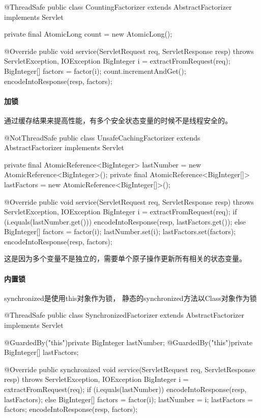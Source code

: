 \begin{Java}[使用AtomicLong来实现原子操作]
@ThreadSafe
public class CountingFactorizer extends AbstractFactorizer implements Servlet {

	private final AtomicLong count = new AtomicLong();
	
	@Override
	public void service(ServletRequest req, ServletResponse resp)
			throws ServletException, IOException {
		BigInteger i = extractFromRequest(req);
		BigInteger[] factors = factor(i);
		count.incrementAndGet();
		encodeIntoResponse(resp, factors);
	}

}
\end{Java}

\paragraph{加锁}通过缓存结果来提高性能，有多个安全状态变量的时候不是线程安全的。
\begin{Java}
@NotThreadSafe
public class UnsafeCachingFactorizer extends AbstractFactorizer implements
		Servlet {
	
	private final AtomicReference<BigInteger> lastNumber 
		= new AtomicReference<BigInteger>();
	private final AtomicReference<BigInteger[]> lastFactors
		= new AtomicReference<BigInteger[]>();

	@Override
	public void service(ServletRequest req, ServletResponse resp)
			throws ServletException, IOException {
		BigInteger i = extractFromRequest(req);
		if (i.equals(lastNumber.get())) {
			encodeIntoResponse(resp, lastFactors.get());
		} else {
			BigInteger[] factors = factor(i);
			lastNumber.set(i);
			lastFactors.set(factors);
			encodeIntoResponse(resp, factors);
		}
	}

}
\end{Java}
这是因为多个变量不是独立的，需要单个原子操作更新所有相关的状态变量。

\paragraph{内置锁}

synchronized是使用this对象作为锁，
静态的synchronized方法以Class对象作为锁

\begin{Java}
@ThreadSafe
public class SynchronizedFactorizer extends AbstractFactorizer implements
		Servlet {

	@GuardedBy("this")private BigInteger lastNumber;
	@GuardedBy("this")private BigInteger[] lastFactors;

	@Override
	public synchronized void service(ServletRequest req, ServletResponse resp)
			throws ServletException, IOException {
		BigInteger i = extractFromRequest(req);
		if (i.equals(lastNumber)) {
			encodeIntoResponse(resp, lastFactors);
		} else {
			BigInteger[] factors = factor(i);
			lastNumber = i;
			lastFactors = factors;
			encodeIntoResponse(resp, factors);
		}
	}
}
\end{Java}

